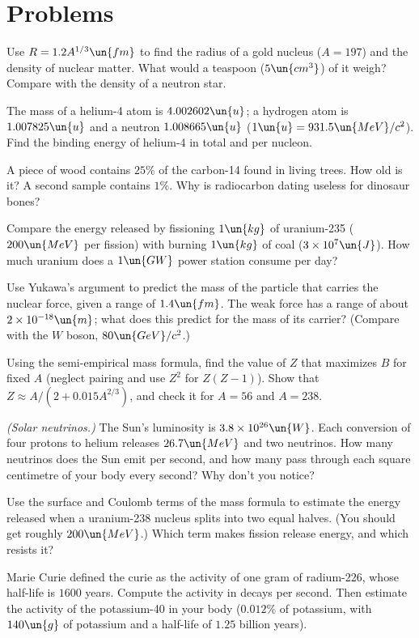 \section{Problems}

\begin{problems}
\core Use $R = 1.2A^{1/3}\un{fm}$ to find the radius of a gold nucleus ($A=197$) and the density of nuclear matter. What would a teaspoon ($5\un{cm^3}$) of it weigh? Compare with the density of a neutron star.

 The mass of a helium-4 atom is $4.002602\un{u}$; a hydrogen atom is $1.007825\un{u}$ and a neutron $1.008665\un{u}$ ($1\un{u} = 931.5\un{MeV}/c^2$). Find the binding energy of helium-4 in total and per nucleon.

\core A piece of wood contains $25\%$ of the carbon-14 found in living trees. How old is it? A second sample contains $1\%$. Why is radiocarbon dating useless for dinosaur bones?

 Compare the energy released by fissioning $1\un{kg}$ of uranium-235 ($200\un{MeV}$ per fission) with burning $1\un{kg}$ of coal ($3\times10^{7}\un{J}$). How much uranium does a $1\un{GW}$ power station consume per day?

\core Use Yukawa's argument to predict the mass of the particle that carries the nuclear force, given a range of $1.4\un{fm}$. The weak force has a range of about $2\times10^{-18}\un{m}$; what does this predict for the mass of its carrier? (Compare with the $W$ boson, $80\un{GeV}/c^2$.)

\core Using the semi-empirical mass formula, find the value of $Z$ that maximizes $B$ for fixed $A$ (neglect pairing and use $Z^2$ for $Z(Z-1)$). Show that $Z\approx A/(2 + 0.015A^{2/3})$, and check it for $A = 56$ and $A = 238$.

\core \emph{(Solar neutrinos.)} The Sun's luminosity is $3.8\times10^{26}\un{W}$. Each conversion of four protons to helium releases $26.7\un{MeV}$ and two neutrinos. How many neutrinos does the Sun emit per second, and how many pass through each square centimetre of your body every second? Why don't you notice?

 Use the surface and Coulomb terms of the mass formula to estimate the energy released when a uranium-238 nucleus splits into two equal halves. (You should get roughly $200\un{MeV}$.) Which term makes fission release energy, and which resists it?

 Marie Curie defined the curie as the activity of one gram of radium-226, whose half-life is $1600$ years. Compute the activity in decays per second. Then estimate the activity of the potassium-40 in your body ($0.012\%$ of potassium, with $140\un{g}$ of potassium and a half-life of $1.25$ billion years).


\end{problems}
